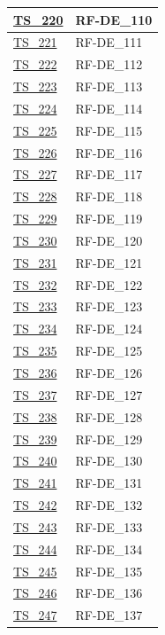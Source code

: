 \begin{longtable}{|
    >{\raggedright\arraybackslash}p{} |
    >{\centering\arraybackslash}p{} |
    }
    \hyperlink{ts-220}{TS\_220} & RF-DE\_110 \\ \hline
    \hyperlink{ts-221}{TS\_221} & RF-DE\_111 \\ \hline
    \hyperlink{ts-222}{TS\_222} & RF-DE\_112 \\ \hline
    \hyperlink{ts-223}{TS\_223} & RF-DE\_113 \\ \hline
    \hyperlink{ts-224}{TS\_224} & RF-DE\_114 \\ \hline
    \hyperlink{ts-225}{TS\_225} & RF-DE\_115 \\ \hline
    \hyperlink{ts-226}{TS\_226} & RF-DE\_116 \\ \hline
    \hyperlink{ts-227}{TS\_227} & RF-DE\_117 \\ \hline
    \hyperlink{ts-228}{TS\_228} & RF-DE\_118 \\ \hline
    \hyperlink{ts-229}{TS\_229} & RF-DE\_119 \\ \hline
    \hyperlink{ts-230}{TS\_230} & RF-DE\_120 \\ \hline
    \hyperlink{ts-231}{TS\_231} & RF-DE\_121 \\ \hline
    \hyperlink{ts-232}{TS\_232} & RF-DE\_122 \\ \hline
    \hyperlink{ts-233}{TS\_233} & RF-DE\_123 \\ \hline
    \hyperlink{ts-234}{TS\_234} & RF-DE\_124 \\ \hline
    \hyperlink{ts-235}{TS\_235} & RF-DE\_125 \\ \hline
    \hyperlink{ts-236}{TS\_236} & RF-DE\_126 \\ \hline
    \hyperlink{ts-237}{TS\_237} & RF-DE\_127 \\ \hline
    \hyperlink{ts-238}{TS\_238} & RF-DE\_128 \\ \hline
    \hyperlink{ts-239}{TS\_239} & RF-DE\_129 \\ \hline
    \hyperlink{ts-240}{TS\_240} & RF-DE\_130 \\ \hline
    \hyperlink{ts-241}{TS\_241} & RF-DE\_131 \\ \hline
    \hyperlink{ts-242}{TS\_242} & RF-DE\_132 \\ \hline
    \hyperlink{ts-243}{TS\_243} & RF-DE\_133 \\ \hline
    \hyperlink{ts-244}{TS\_244} & RF-DE\_134 \\ \hline
    \hyperlink{ts-245}{TS\_245} & RF-DE\_135 \\ \hline
    \hyperlink{ts-246}{TS\_246} & RF-DE\_136 \\ \hline
    \hyperlink{ts-247}{TS\_247} & RF-DE\_137 \\ \hline

\end{longtable}
